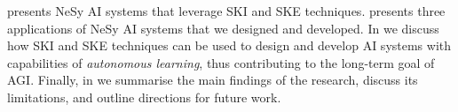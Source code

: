\begin{refsection}
 presents \gls{NeSy} \gls{AI} systems that leverage \gls{SKI} and \gls{SKE} techniques.
%
 presents three applications of \gls{NeSy} \gls{AI} systems that we designed and developed.
%
In  we discuss how \gls{SKI} and \gls{SKE} techniques can be used to design and develop \gls{AI} systems with capabilities of \emph{autonomous learning}, thus contributing to the long-term goal of \gls{AGI}.
%
Finally, in  we summarise the main findings of the research, discuss its limitations, and outline directions for future work.



\printbibliography[title=Reference,heading=bibintoc]

\end{refsection}